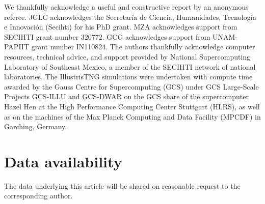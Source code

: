 \documentclass[fleqn,usenatbib]{mnras}
\begin{document}
We thankfully acknowledge a useful and constructive report by an anonymous referee.
JGLC acknowledges the  Secretaría de Ciencia, Humanidades, Tecnología e Innovación (Secihti) for his PhD grant. 
MZA acknowledges support from SECIHTI grant number 320772.
GCG acknowledges support from UNAM-PAPIIT grant number IN110824.
The authors thankfully acknowledge computer resources, technical advice, and support provided by National Supercomputing Laboratory of Southeast Mexico, a member of the SECIHTI network of national laboratories. 
The IllustrisTNG simulations were undertaken with compute time awarded by the Gauss Centre for Supercomputing (GCS) under GCS Large-Scale Projects GCS-ILLU and GCS-DWAR on the GCS share of the supercomputer Hazel Hen at the High Performance Computing Center Stuttgart (HLRS), as well as on the machines of the Max Planck Computing and Data Facility (MPCDF) in Garching, Germany.

\section*{Data availability}
The data underlying this article will be shared on reasonable request to the corresponding author.


















\bsp	%
\label{lastpage}
\end{document}

